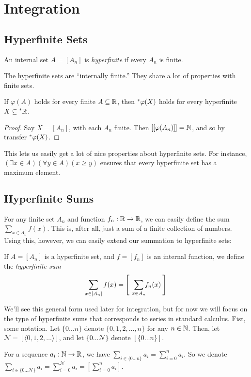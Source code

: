 \section{Integration}
\subsection{Hyperfinite Sets}
\begin{defn}
    An internal set $A = [A_n]$ is \textit{hyperfinite} if every $A_n$ is finite.
\end{defn}

The hyperfinite sets are ``internally finite.'' They share a lot of properties with finite sets.

\begin{thm}\label{HyperfiniteTransfer}
    If $\varphi(A)$ holds for every finite $A \subseteq \mathbb{R}$, then $\prescript{*}{}{\varphi}(X)$ holds for every hyperfinite $X \subseteq \prescript{*}{}{\mathbb{R}}$.
\end{thm}

\begin{proof}
    Say $X = [A_n]$, with each $A_n$ finite. Then $[[\varphi(A_n)]] = \mathbb{N}$, and so by transfer $\prescript{*}{}{\varphi}(X)$.
\end{proof}

This lets us easily get a lot of nice properties about hyperfinite sets. For instance, $(\exists x \in A)(\forall y \in A) (x \geq y)$ ensures that every hyperfinite set has a maximum element.

\subsection{Hyperfinite Sums}
For any finite set $A_n$ and function $f_n: \mathbb{R} \to \mathbb{R}$, we can easily define the sum $\sum_{x \in A_n} f(x)$. This is, after all, just a sum of a finite collection of numbers. Using this, however, we can easily extend our summation to hyperfinite sets:

\begin{defn}
    If $A = [A_n]$ is a hyperfinite set, and $f = [f_n]$ is an internal function, we define the \textit{hyperfinite sum}
    \[\sum_{x \in [A_n]} f(x) = \left[\ \ \sum_{\mathclap{x \in A_n}} f_n(x) \:\right]\] %
\end{defn}

We'll see this general form used later for integration, but for now we will focus on the type of hyperfinite sums that corresponds to series in standard calculus. Fist, some notation. Let $\{0\ldots n\}$ denote $\{0, 1, 2, \ldots, n\}$ for any $n \in \mathbb{N}$. Then, let $\mathscr{N} = [\langle 0, 1, 2, \ldots \rangle]$, and let $\{0\ldots\mathscr{N}\}$ denote $[\{0\ldots n\}]$.

For a sequence $a_i: \mathbb{N} \to \mathbb{R}$, we have $\sum_{i \in \{0\ldots n\}} a_i = \sum_{i = 0}^n a_i$. So we denote $\sum_{i \in \{0\ldots \mathscr{N}\}} a_i = \sum_{i = 0}^\mathscr{N} a_i = \left[\sum_{i=0}^n a_i\right]$.